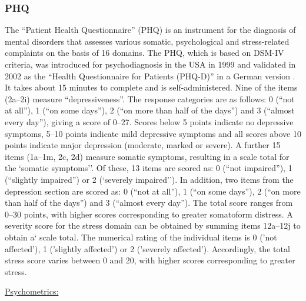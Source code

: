\subsubsection{\acl{PHQ}}
\label{questionnaires:PHQ}
The ``Patient Health Questionnaire'' (\acs{PHQ}) is an instrument for the diagnosis of mental disorders that assesses various somatic, psychological and stress-related complaints on the basis of 16 domains. The \acs{PHQ}, which is based on DSM-IV criteria, was introduced for psychodiagnosis in the USA in 1999 \cite{spitzer1999phq} and validated in 2002 as the ``Health Questionnaire for Patients (PHQ-D)'' in a German version \cite{lowe2002phq}. It takes about 15 minutes to complete and is self-administered. Nine of the items (2a--2i) measure ``depressiveness''. The response categories are as follows: 0 (``not at all''), 1 (``on some days''), 2 (``on more than half of the days'') and 3 (``almost every day''), giving a score of 0--27. Scores below 5 points indicate no depressive symptoms, 5--10 points indicate mild depressive symptoms and all scores above 10 points indicate major depression (moderate, marked or severe). A further 15 items (1a--1m, 2c, 2d) measure somatic symptoms, resulting in a scale total for the `somatic symptoms''. Of these, 13 items are scored as: 0 (``not impaired''), 1 (``slightly impaired'') or 2 (`severely impaired''). In addition, two items from the depression section are scored as: 0 (``not at all''), 1 (``on some days''), 2 (``on more than half of the days'') and 3 (``almost every day''). The total score ranges from 0--30 points, with higher scores corresponding to greater somatoform distress. 
A severity score for the stress domain can be obtained by summing items 12a--12j to obtain a` scale total. The numerical rating of the individual items is 0 ('not affected'), 1 ('slightly affected') or 2 ('severely affected'). Accordingly, the total stress score varies between 0 and 20, with higher scores corresponding to greater stress.

\underline{Psychometrics:}

